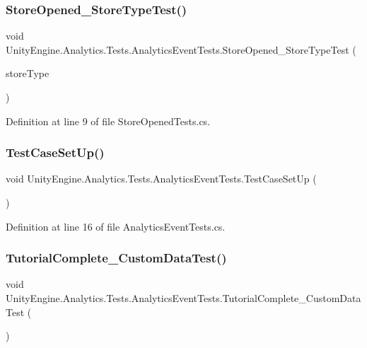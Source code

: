\subsubsection{\texorpdfstring{StoreOpened\_StoreTypeTest()}{StoreOpened\_StoreTypeTest()}}
{\footnotesize\ttfamily void Unity\+Engine.\+Analytics.\+Tests.\+Analytics\+Event\+Tests.\+Store\+Opened\+\_\+\+Store\+Type\+Test (\begin{DoxyParamCaption}\item[{\mbox{[}\+Values(\+Store\+Type.\+Premium, Store\+Type.\+Soft)\mbox{]} Store\+Type}]{store\+Type }\end{DoxyParamCaption})}



Definition at line 9 of file Store\+Opened\+Tests.\+cs.

\mbox{\label{class_unity_engine_1_1_analytics_1_1_tests_1_1_analytics_event_tests_a553b95270ae65bec0dd15863d17f22ea}} 
\subsubsection{\texorpdfstring{TestCaseSetUp()}{TestCaseSetUp()}}
{\footnotesize\ttfamily void Unity\+Engine.\+Analytics.\+Tests.\+Analytics\+Event\+Tests.\+Test\+Case\+Set\+Up (\begin{DoxyParamCaption}{ }\end{DoxyParamCaption})}



Definition at line 16 of file Analytics\+Event\+Tests.\+cs.

\mbox{\label{class_unity_engine_1_1_analytics_1_1_tests_1_1_analytics_event_tests_aff1257bd6655a8b812e47375d4be49e8}} 
\subsubsection{\texorpdfstring{TutorialComplete\_CustomDataTest()}{TutorialComplete\_CustomDataTest()}}
{\footnotesize\ttfamily void Unity\+Engine.\+Analytics.\+Tests.\+Analytics\+Event\+Tests.\+Tutorial\+Complete\+\_\+\+Custom\+Data\+Test (\begin{DoxyParamCaption}{ }\end{DoxyParamCaption})}



